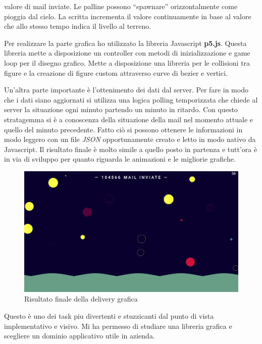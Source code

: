 \documentclass[a4paper]{article}
\begin{document}
valore di mail inviate. Le palline possono ``spawnare'' orizzontalmente come pioggia dal
cielo. La scritta incrementa il valore continuamente in base al valore che allo stesso tempo
indica il livello al terreno.
\par Per realizzare la parte grafica ho utilizzato la libreria Javascript \textbf{p5.js}.
Questa libreria mette a disposizione un controller con metodi di inizializzazione e game loop
per il disegno grafico. Mette a disposizione una libreria per le collisioni tra figure e la creazione
di figure custom attraverso curve di bezier e vertici.
\par Un'altra parte importante è l'ottenimento dei dati dal server. Per fare in modo che i dati
siano aggiornati si utilizza una logica polling temporizzata che chiede al server la situazione
ogni minuto partendo un minuto in ritardo. Con questo stratagemma si è a conoscenza della situazione della mail
nel momento attuale e quello del minuto precedente. Fatto ciò si possono ottenere le informazioni
in modo leggero con un file \emph{JSON} opportunamente creato e letto in modo nativo da Javascript.
Il risultato finale è molto simile a quello posto in partenza e tutt'ora è in via di sviluppo per 
quanto riguarda le animazioni e le migliorie grafiche.
\begin{figure}[H]
	\includegraphics[width=\textwidth]{delivery-final.png}
	\centering
	\caption{Risultato finale della delivery grafica}
\end{figure}
\par Questo è uno dei task piu divertenti e stuzzicanti dal punto di vista implementativo e
visivo. Mi ha permesso di studiare una libreria grafica e scegliere un dominio applicativo 
utile in azienda.
\end{document}
